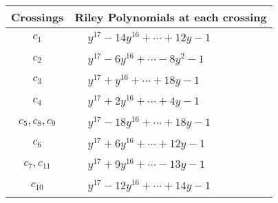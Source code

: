 \documentclass[1p]{elsarticle_modified}
\theoremstyle{definition}
\begin{document}
\begin{tabular}{m{50pt}|m{274pt}}
Crossings & \hspace{64pt}Riley Polynomials at each crossing \\
\hline $$\begin{aligned}c_{1}\end{aligned}$$&$\begin{aligned}
&y^{17}-14 y^{16}+\cdots+12 y-1
\end{aligned}$\\
\hline $$\begin{aligned}c_{2}\end{aligned}$$&$\begin{aligned}
&y^{17}-6 y^{16}+\cdots-8 y^2-1
\end{aligned}$\\
\hline $$\begin{aligned}c_{3}\end{aligned}$$&$\begin{aligned}
&y^{17}+y^{16}+\cdots+18 y-1
\end{aligned}$\\
\hline $$\begin{aligned}c_{4}\end{aligned}$$&$\begin{aligned}
&y^{17}+2 y^{16}+\cdots+4 y-1
\end{aligned}$\\
\hline $$\begin{aligned}c_{5},c_{8},c_{9}\end{aligned}$$&$\begin{aligned}
&y^{17}-18 y^{16}+\cdots+18 y-1
\end{aligned}$\\
\hline $$\begin{aligned}c_{6}\end{aligned}$$&$\begin{aligned}
&y^{17}+6 y^{16}+\cdots+12 y-1
\end{aligned}$\\
\hline $$\begin{aligned}c_{7},c_{11}\end{aligned}$$&$\begin{aligned}
&y^{17}+9 y^{16}+\cdots-13 y-1
\end{aligned}$\\
\hline $$\begin{aligned}c_{10}\end{aligned}$$&$\begin{aligned}
&y^{17}-12 y^{16}+\cdots+14 y-1
\end{aligned}$\\
\hline
\end{tabular}\\~\\
\end{document}

